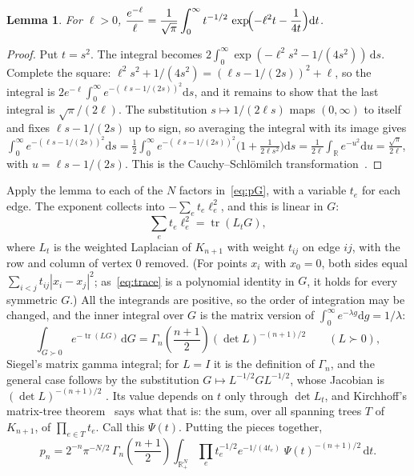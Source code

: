 \documentclass[11pt]{article}
\newtheorem{lemma}{Lemma}
\theoremstyle{remark}
\newcommand{\R}{\mathbb{R}}
\newcommand{\dd}{\mathrm{d}}
\newcommand{\abs}[1]{\left|#1\right|}
\begin{document}
\begin{lemma}\label{lem:schwinger}
For $\ell>0$, $\displaystyle\frac{e^{-\ell}}{\ell}=\frac1{\sqrt\pi}\int_0^\infty t^{-1/2}\,
\exp\!\Bigl(-\ell^2t-\frac1{4t}\Bigr)\dd t$.
\end{lemma}

\begin{proof}
Put $t=s^2$. The integral becomes $2\int_0^\infty\exp(-\ell^2s^2-1/(4s^2))\,\dd s$. Complete the square:
$\ell^2s^2+1/(4s^2)=(\ell s-1/(2s))^2+\ell$, so the integral is $2e^{-\ell}\int_0^\infty
e^{-(\ell s-1/(2s))^2}\dd s$, and it remains to show that the last integral is $\sqrt\pi/(2\ell)$. The
substitution $s\mapsto 1/(2\ell s)$ maps
$(0,\infty)$ to itself and fixes $\ell s-1/(2s)$ up to sign, so averaging the integral with its image
gives $\int_0^\infty e^{-(\ell s-1/(2s))^2}\dd s=\tfrac12\int_0^\infty e^{-(\ell s-1/(2s))^2}
\bigl(1+\tfrac1{2\ell s^2}\bigr)\dd s=\tfrac1{2\ell}\int_{\R}e^{-u^2}\dd u=\tfrac{\sqrt\pi}{2\ell}$, with
$u=\ell s-1/(2s)$. This is the Cauchy--Schl\"omilch transformation~\cite{AGJMPV}.
\end{proof}

Apply the lemma to each of the $N$ factors in~\eqref{eq:pG}, with a variable $t_e$ for each edge. The
exponent collects into $-\sum_e t_e\ell_e^2$, and this is linear in $G$:
\begin{equation}\label{eq:trace}
\sum_e t_e\ell_e^2=\operatorname{tr}(L_tG),
\end{equation}
where $L_t$ is the weighted Laplacian of $K_{n+1}$ with weight $t_{ij}$ on edge $ij$, with the row and
column of vertex $0$ removed. (For points $x_i$ with $x_0=0$, both sides equal
$\sum_{i<j}t_{ij}\abs{x_i-x_j}^2$; as~\eqref{eq:trace} is a polynomial identity in $G$, it holds for every
symmetric $G$.) All the integrands are positive, so the order of integration may be changed, and the
inner integral over $G$ is the matrix version of $\int_0^\infty e^{-\lambda g}\dd g=1/\lambda$:
\begin{equation}\label{eq:siegel}
\int_{G\succ0}e^{-\operatorname{tr}(LG)}\,\dd G=\Gamma_n\!\left(\frac{n+1}2\right)(\det L)^{-(n+1)/2}
\qquad(L\succ0),
\end{equation}
Siegel's matrix gamma integral; for $L=I$ it is the definition of $\Gamma_n$, and the general case follows
by the substitution $G\mapsto L^{-1/2}GL^{-1/2}$, whose Jacobian is $(\det L)^{-(n+1)/2}$
\cite[Section~2.1]{Mui82}. Its value depends on $t$ only through
$\det L_t$, and Kirchhoff's matrix-tree theorem~\cite{Kir1847} says what that is: the sum, over all
spanning trees $T$ of $K_{n+1}$, of $\prod_{e\in T}t_e$. Call this $\Psi(t)$. Putting the pieces together,
\[
p_n=2^{-n}\pi^{-N/2}\,\Gamma_n\!\left(\frac{n+1}2\right)\int_{\R_+^N}\prod_e t_e^{-1/2}e^{-1/(4t_e)}\;
\Psi(t)^{-(n+1)/2}\,\dd t .
\]
\end{document}
